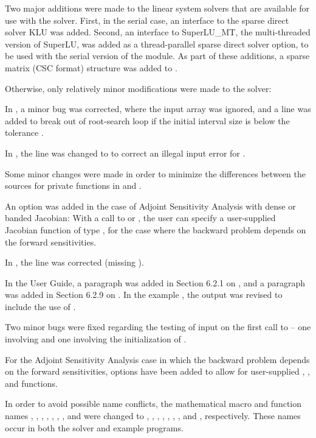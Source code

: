 Two major additions were made to the linear system solvers that are
available for use with the {\cvodes} solver.  First, in the serial case,
an interface to the sparse direct solver KLU was added.
Second, an interface to SuperLU\_MT, the multi-threaded version of
SuperLU, was added as a thread-parallel sparse direct solver option,
to be used with the serial version of the {\nvector} module.
As part of these additions, a sparse matrix (CSC format) structure
was added to {\cvodes}.

Otherwise, only relatively minor modifications were made to the
{\cvodes} solver:

In , a minor bug was corrected, where the input
array  was ignored, and a line was added to break out of
root-search loop if the initial interval size is below the tolerance
.

In , the line  was changed to
 to correct an illegal input error for .

Some minor changes were made in order to minimize the differences
between the sources for private functions in {\cvodes} and {\cvode}.

An option was added in the case of Adjoint Sensitivity Analysis with
dense or banded Jacobian:  With a call to  or
, the user can specify a user-supplied Jacobian
function of type , for the case where the backward
problem depends on the forward sensitivities.

In , the line 
was corrected (missing ).

In the User Guide, a paragraph was added in Section 6.2.1 on
, and a paragraph was added in Section 6.2.9 on
.  In the example , the output
was revised to include the use of .

Two minor bugs were fixed regarding the testing of input on the first
call to  -- one involving  and one involving the
initialization of .

For the Adjoint Sensitivity Analysis case in which the backward problem
depends on the forward sensitivities, options have been added to allow
for user-supplied , , and  functions.

In order to avoid possible name conflicts, the mathematical macro
and function names , , , , ,
, , and  were changed to
, , , , ,
, , and , respectively.
These names occur in both the solver and example programs.

